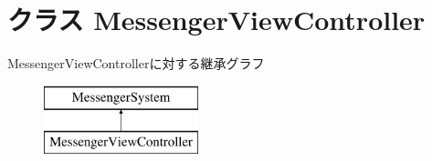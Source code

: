 \hypertarget{interface_messenger_view_controller}{
\section{クラス MessengerViewController}
\label{d7/d34/interface_messenger_view_controller}
}
MessengerViewControllerに対する継承グラフ\begin{figure}[H]
\begin{center}
\leavevmode
\includegraphics[height=2.000000cm]{d7/d34/interface_messenger_view_controller}
\end{center}
\end{figure}
